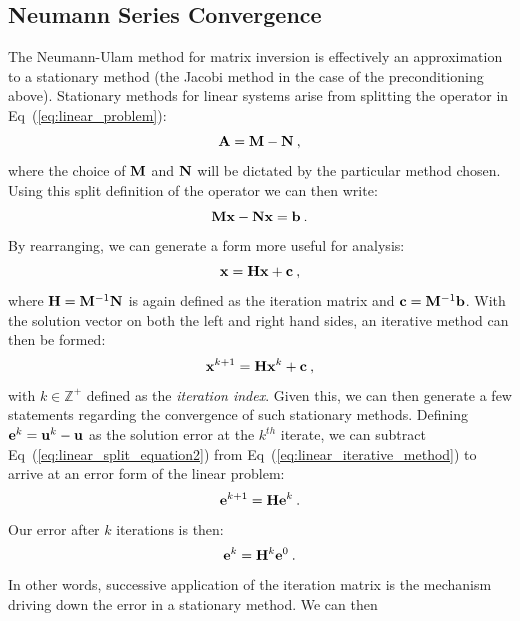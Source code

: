 \documentclass{mc2013}
\begin{document}
\subsection{Neumann Series Convergence}
\label{subsec:neumann_convergence}

The Neumann-Ulam method for matrix inversion is effectively an
approximation to a stationary method (the Jacobi method in the case of
the preconditioning above). Stationary methods for linear systems
arise from splitting the operator in Eq~(\ref{eq:linear_problem}):
\begin{equation}
  \mathbf{A} = \mathbf{M} - \mathbf{N}\:,
  \label{eq:split_linear_operator}
\end{equation}
where the choice of $\mathbf{M}$ and $\mathbf{N}$ will be dictated by the
particular method chosen. Using this split definition of the operator
we can then write:
\begin{equation}
  \mathbf{M}\mathbf{x} - \mathbf{N}\mathbf{x} = \mathbf{b}\:.
  \label{eq:linear_split_equation1}
\end{equation}
By rearranging, we can generate a form more useful for analysis:
\begin{equation}
  \mathbf{x} = \mathbf{H}\mathbf{x} + \mathbf{c}\:,
  \label{eq:linear_split_equation2}
\end{equation}
where $\mathbf{H}=\mathbf{M}^{-1}\mathbf{N}$ is again defined as the iteration
matrix and $\mathbf{c}=\mathbf{M}^{-1}\mathbf{b}$. With the solution vector on
both the left and right hand sides, an iterative method can then be
formed:
\begin{equation}
  \mathbf{x}^{k+1} = \mathbf{H}\mathbf{x}^k + \mathbf{c}\:,
  \label{eq:linear_iterative_method}
\end{equation}
with $k \in \mathbb{Z}^+$ defined as the \textit{iteration
  index}. Given this, we can then generate a few statements regarding
the convergence of such stationary methods. Defining $\mathbf{e}^k =
\mathbf{u}^k - \mathbf{u}$ as the solution error at the $k^{th}$ iterate, we
can subtract Eq~(\ref{eq:linear_split_equation2}) from
Eq~(\ref{eq:linear_iterative_method}) to arrive at an error form of
the linear problem:
\begin{equation}
  \mathbf{e}^{k+1} = \mathbf{H}\mathbf{e}^k\:. 
  \label{eq:linear_iterative_error}
\end{equation}
Our error after $k$ iterations is then:
\begin{equation}
  \mathbf{e}^{k} = \mathbf{H}^k\mathbf{e}^0\:. 
  \label{eq:linear_k_iter_error}
\end{equation}
In other words, successive application of the iteration matrix is the
mechanism driving down the error in a stationary method. We can then
\end{document}
